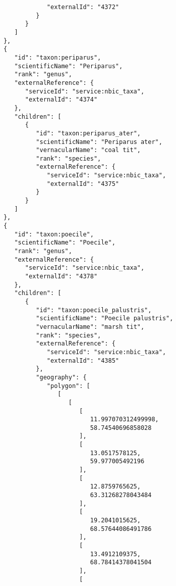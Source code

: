 \documentclass[10pt,letterpaper]{article}
\begin{document}
\begin{verbatim}
                        "externalId": "4372"
                     }
                  }
               ]
            },
            {
               "id": "taxon:periparus",
               "scientificName": "Periparus",
               "rank": "genus",
               "externalReference": {
                  "serviceId": "service:nbic_taxa",
                  "externalId": "4374"
               },
               "children": [
                  {
                     "id": "taxon:periparus_ater",
                     "scientificName": "Periparus ater",
                     "vernacularName": "coal tit",
                     "rank": "species",
                     "externalReference": {
                        "serviceId": "service:nbic_taxa",
                        "externalId": "4375"
                     }
                  }
               ]
            },
            {
               "id": "taxon:poecile",
               "scientificName": "Poecile",
               "rank": "genus",
               "externalReference": {
                  "serviceId": "service:nbic_taxa",
                  "externalId": "4378"
               },
               "children": [
                  {
                     "id": "taxon:poecile_palustris",
                     "scientificName": "Poecile palustris",
                     "vernacularName": "marsh tit",
                     "rank": "species",
                     "externalReference": {
                        "serviceId": "service:nbic_taxa",
                        "externalId": "4385"
                     },
                     "geography": {
                        "polygon": [
                           [
                              [
                                 [
                                    11.997070312499998,
                                    58.74540696858028
                                 ],
                                 [
                                    13.0517578125,
                                    59.977005492196
                                 ],
                                 [
                                    12.8759765625,
                                    63.31268278043484
                                 ],
                                 [
                                    19.2041015625,
                                    68.57644086491786
                                 ],
                                 [
                                    13.4912109375,
                                    68.78414378041504
                                 ],
                                 [

\end{verbatim}
\end{document}
